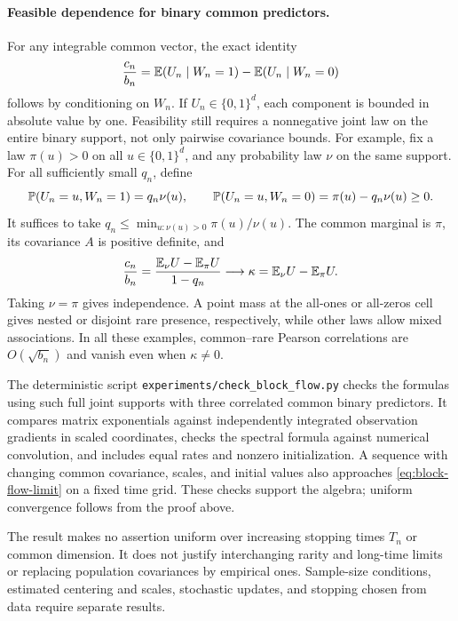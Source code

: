 \paragraph{Feasible dependence for binary common predictors.}

For any integrable common vector, the exact identity
\[
 \frac{c_n}{b_n} = \mathbb{E}(U_n \mid W_n = 1) - \mathbb{E}(U_n \mid W_n = 0)
\]
follows by conditioning on $W_n$. If $U_n \in \{0,1\}^d$, each component is
bounded in absolute value by one. Feasibility still requires a nonnegative joint
law on the entire binary support, not only pairwise covariance bounds. For
example, fix a law $\pi(u) > 0$ on all $u \in \{0,1\}^d$, and any probability
law $\nu$ on the same support. For all sufficiently small $q_n$, define
\[
 \mathbb{P}(U_n = u,W_n = 1) = q_n\nu(u),\qquad \mathbb{P}(U_n = u,W_n = 0)
                        = \pi(u) - q_n\nu(u)
                        \ge 0.
\]
It suffices to take $q_n \le \min_{u:\nu(u)>0}\pi(u)/\nu(u)$. The common
marginal is $\pi$, its covariance $A$ is positive definite, and
\[
 \frac{c_n}{b_n} = \frac{\mathbb{E}_\nu U - \mathbb{E}_\pi U}{1 - q_n}
                 \longrightarrow \kappa
                 = \mathbb{E}_\nu U - \mathbb{E}_\pi U.
\]
Taking $\nu = \pi$ gives independence. A point mass at the all-ones or all-zeros
cell gives nested or disjoint rare presence, respectively, while other laws
allow mixed associations. In all these examples, common--rare Pearson
correlations are $O(\sqrt{b_n})$ and vanish even when $\kappa \ne 0$.

The deterministic script \texttt{experiments/check\_block\_flow.py} checks the
formulas using such full joint supports with three correlated common binary
predictors. It compares matrix exponentials against independently integrated
observation gradients in scaled coordinates, checks the spectral formula against
numerical convolution, and includes equal rates and nonzero initialization. A
sequence with changing common covariance, scales, and initial values also
approaches \eqref{eq:block-flow-limit} on a fixed time grid. These checks
support the algebra; uniform convergence follows from the proof above.

The result makes no assertion uniform over increasing stopping times $T_n$ or
common dimension. It does not justify interchanging rarity and long-time limits
or replacing population covariances by empirical ones. Sample-size conditions,
estimated centering and scales, stochastic updates, and stopping chosen from
data require separate results.
